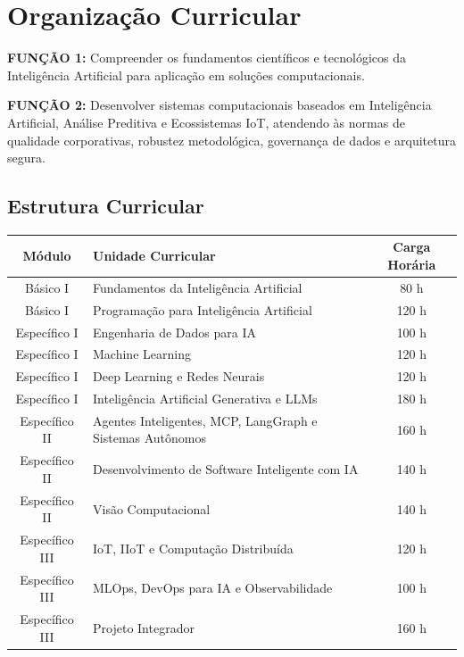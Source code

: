 \chapter{Organização Curricular}

\textbf{FUNÇÃO 1:} Compreender os fundamentos científicos e tecnológicos da Inteligência Artificial para aplicação em soluções computacionais.

\textbf{FUNÇÃO 2:} Desenvolver sistemas computacionais baseados em Inteligência
Artificial, Análise Preditiva e Ecossistemas IoT, atendendo às normas de qualidade
corporativas, robustez metodológica, governança de dados e arquitetura segura.

\section{Estrutura Curricular}

\begin{table}[htb]
\centering
\renewcommand{\arraystretch}{1.2} %
\begin{tabular}{|c|l|c|}
\hline
\textbf{Módulo} & \textbf{Unidade Curricular} & \textbf{Carga Horária} \\
\hline
Básico I & Fundamentos da Inteligência Artificial & 80 h \\
\hline
Básico I & Programação para Inteligência Artificial & 120 h \\
\hline
Específico I & Engenharia de Dados para IA & 100 h \\
\hline
Específico I & Machine Learning & 120 h \\
\hline
Específico I & Deep Learning e Redes Neurais & 120 h \\
\hline
Específico I & Inteligência Artificial Generativa e LLMs & 180 h \\
\hline
Específico II & Agentes Inteligentes, MCP, LangGraph e Sistemas Autônomos & 160 h \\
\hline
Específico II & Desenvolvimento de Software Inteligente com IA & 140 h \\
\hline
Específico II & Visão Computacional & 140 h \\
\hline
Específico III & IoT, IIoT e Computação Distribuída & 120 h \\
\hline
Específico III & MLOps, DevOps para IA e Observabilidade & 100 h \\
\hline
Específico III & Projeto Integrador & 160 h \\
\hline
\end{tabular}
\end{table}

